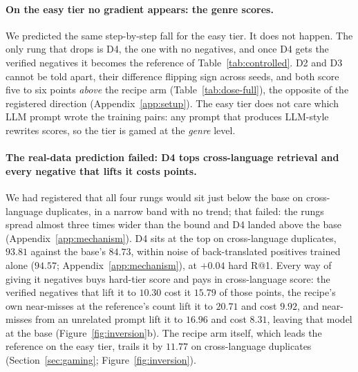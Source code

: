 \paragraph{On the easy tier no gradient appears: the genre scores.}We predicted the same step-by-step fall for the easy tier. It does not happen. The only rung that drops is D4, the one with no negatives, and once D4 gets the verified negatives it becomes the reference of Table~\ref{tab:controlled}. D2 and D3 cannot be told apart, their difference flipping sign across seeds, and both score five to six points \emph{above} the recipe arm (Table~\ref{tab:dose-full}), the opposite of the registered direction (Appendix~\ref{app:setup}). The easy tier does not care which LLM prompt wrote the training pairs: any prompt that produces LLM-style rewrites scores, so the tier is gamed at the \emph{genre} level.

\paragraph{The real-data prediction failed: D4 tops cross-language retrieval and every negative that lifts it costs points.}
We had registered that all four rungs would sit just below the base on cross-language duplicates, in a narrow band with no trend; that failed: the rungs spread almost three times wider than the bound and D4 landed above the base (Appendix~\ref{app:mechanism}). D4 sits at the top on cross-language duplicates, $93.81$ against the base's $84.73$, within noise of back-translated positives trained alone ($94.57$; Appendix~\ref{app:mechanism}), at $+0.04$ hard R@1. Every way of giving it negatives buys hard-tier score and pays in cross-language score: the verified negatives that lift it to $10.30$ cost it $15.79$ of those points, the recipe's own near-misses at the reference's count lift it to $20.71$ and cost $9.92$, and near-misses from an unrelated prompt lift it to $16.96$ and cost $8.31$, leaving that model at the base (Figure~\ref{fig:inversion}b). The recipe arm itself, which leads the reference on the easy tier, trails it by $11.77$ on cross-language duplicates (Section~\ref{sec:gaming}; Figure~\ref{fig:inversion}).

